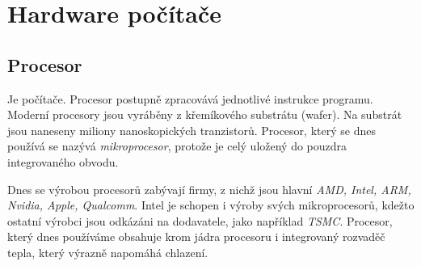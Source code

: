 \documentclass[a4paper]{article}
\begin{document}
\newpage


\section{Hardware počítače}
    \subsection{Procesor}
        Je  počítače. Procesor postupně zpracovává jednotlivé instrukce programu. Moderní procesory jsou vyráběny z křemíkového substrátu (wafer). Na substrát jsou naneseny miliony nanoskopických tranzistorů. Procesor, který se dnes používá se nazývá \textit{mikroprocesor}, protože je celý uložený do pouzdra integrovaného obvodu. \par
        Dnes se výrobou procesorů zabývají firmy, z nichž jsou hlavní \textit{AMD, Intel, ARM, Nvidia, Apple, Qualcomm}. Intel je schopen i výroby svých mikroprocesorů, kdežto ostatní výrobci jsou odkázáni na dodavatele, jako například \textit{TSMC}.
        Procesor, který dnes používáme obsahuje krom jádra procesoru i integrovaný rozvaděč tepla, který výrazně napomáhá chlazení.
\end{document}
